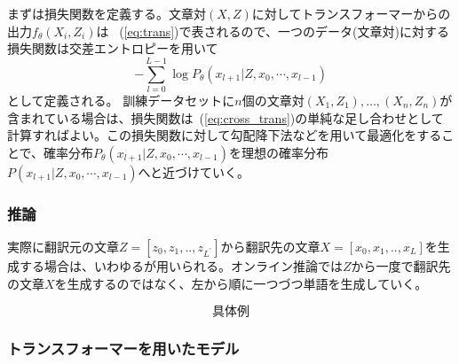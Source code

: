 まずは損失関数を定義する。文章対$(X, Z)$に対してトランスフォーマーからの出力$f_\theta(X_i, Z_i)$は
~(\ref{eq:trans})で表されるので、一つのデータ(文章対)に対する損失関数は交差エントロピーを用いて
\begin{equation}
  \label{eq:cross_trans}
  - \sum_{l=0}^{L-1} \log P_\theta(x_{l+1} | Z, x_0, \cdots, x_{l-1} )
\end{equation}
として定義される。
  \label{eq:cross_trans}
訓練データセットに$n$個の文章対$(X_1, Z_1),\ldots, (X_n, Z_n)$が含まれている場合は、損失関数は~(\ref{eq:cross_trans})の単純な足し合わせとして計算すればよい。この損失関数に対して勾配降下法などを用いて最適化をすることで、確率分布$P_\theta(x_{l+1} | Z, x_0, \cdots, x_{l-1} )$を理想の確率分布$P(x_{l+1} | Z, x_0, \cdots, x_{l-1} )$へと近づけていく。 

\subsubsection{推論}
実際に翻訳元の文章$Z = [z_0, z_1, .., z_{L^\prime}]$から翻訳先の文章$X = [x_0, x_1, .., x_{L}]$を生成する場合は、いわゆるが用いられる。オンライン推論では$Z$から一度で翻訳先の文章$X$を生成するのではなく、左から順に一つづつ単語を生成していく。


\begin{equation*}
  \text{具体例}
\end{equation*}


\subsubsection{トランスフォーマーを用いたモデル}